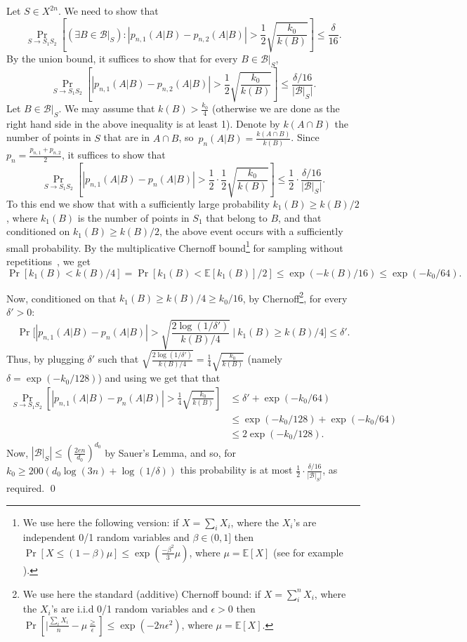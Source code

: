 \documentclass{article}
\def\B{{\mathcal B}}
\newcommand{\Ex}{\mathbb{E}} %
\newcommand{\eps}{\epsilon}
\begin{document}
Let $S\in X^{2n}$. 
We need to show that
\[\Pr_{S\to S_1S_2}\left[(\exists B\in \B|_S) : \left\lvert p_{n,1}(A \vert B) - p_{n,2}(A \vert B)  \right\rvert > \frac{1}{2}\sqrt{\frac{k_0}{k(B)}} \right] \leq \frac{\delta}{16}.\]
By the union bound, it suffices to show that for every $B\in \B|_S$, 
\[\Pr_{S\to S_1S_2}\left[\left\lvert p_{n,1}(A \vert B) - p_{n,2}(A \vert B)  \right\rvert > \frac{1}{2}\sqrt{\frac{k_0}{k(B)}} \right] \leq \frac{\delta/16}{\lvert \B|_S\rvert}.\]
Let $B\in \B|_S$. We may assume that $k(B)> \frac{k_0}{4}$ 
(otherwise we are done as the right hand side in the above inequality is at least 1). 
	Denote by $k(A\cap B)$ the number of points in $S$ that are in $A\cap B$, 
	so~$p_n(A\vert B) = \frac{k(A\cap B)}{k(B)}$.
	Since $p_n = \frac{p_{n,1}+p_{n,2}}{2}$, it suffices to show that
	\[\Pr_{S\to S_1S_2}\left[\left\lvert p_{n,1}(A \vert B) - p_{n}(A \vert B)  \right\rvert 
	> \frac{1}{2}\cdot\frac{1}{2}\sqrt{\frac{k_0}{k(B)}} \right] 
	\leq \frac{1}{2}\cdot\frac{\delta/16}{\lvert \B|_S\rvert}.\]
	To this end we show that with a sufficiently large probability $k_1(B)\geq k(B)/2$, 
	where $k_1(B)$ is the number of points in $S_1$ that belong to $B$,
	and that conditioned on $k_1(B)\geq k(B)/2$, the above event occurs with a sufficiently small probability.
	By the multiplicative Chernoff bound\footnote{We use here the following version: if $X=\sum_i X_i$, where the $X_i$'s 
	are independent 0/1 random variables and $\beta\in (0,1]$ then $\Pr[X\leq (1-\beta)\mu] \leq \exp(\frac{-\beta^2}{3}\mu)$, 
	where $\mu=\Ex[X]$ (see for example \cite{}).} for sampling without repetitions~\cite{H63}, we get 
	\begin{equation}\label{eq:cond}
	\Pr[k_1(B) < k(B)/4] = \Pr\left[k_1(B) < \Ex[k_1(B)]/2\right]  \leq \exp\left(-k(B)/16\right) \leq \exp(-k_0/64).
	\end{equation}

Now, conditioned on that $k_1(B) \geq k(B)/4\geq k_0/16$, by Chernoff\footnote{We use here the standard (additive) Chernoff 	
	bound: if $X=\sum_i^n X_i$, where the $X_i$'s are i.i.d 0/1 random variables and $\eps >0$ then 
	$\Pr[\lvert\frac{\sum_iX_i}{n} - \mu\frac \geq \eps]\leq \exp(-2n\eps^2)$, where $\mu=\Ex[X]$.}, for every $\delta' >0$:
	\[\Pr\Biggl[ \left\lvert p_{n,1}(A \vert B) - p_n(A \vert B) \right\rvert >
	\sqrt{\frac{2\log(1/\delta')}{k(B)/4}}~ \Biggr\vert~ k_1(B) \geq k(B)/4\Biggr] \leq \delta'.\]
	Thus, by plugging $\delta'$ such that $\sqrt{\frac{2\log(1/\delta')}{k(B)/4}} = \frac{1}{4}\sqrt{\frac{k_0}{k(B)}}$
	(namely $\delta = \exp(-k_0/128)$) and using  we get that that
\begin{align*}
\Pr_{S\to S_1S_2}\left[\left\lvert p_{n,1}(A \vert B) - p_{n}(A \vert B)  \right\rvert > \frac{1}{4}\sqrt{\frac{k_0}{k(B)}} \right] 
&\leq  \delta' + \exp(-k_0/64)\\
&\leq  \exp(-k_0/128) + \exp(-k_0/64)\\
&\leq 2\exp(-k_0/128).
\end{align*}
Now, $\left\lvert \B|_S\right\rvert \leq \left(\frac{2en}{d_0}\right)^{d_0}$ by Sauer's Lemma,  and so, for $k_0 \geq 200 \left( d_0 \log(3n) + \log(1/\delta)\right)$ this probability is at most $\frac{1}{2}\cdot\frac{\delta/16}{\lvert \B|_S\rvert}$, as required.
\qed
\end{document}
